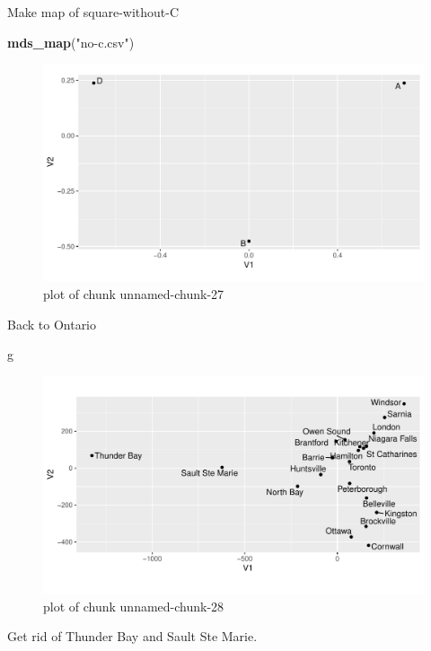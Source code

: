 \documentclass[ignorenonframetext,]{beamer}
\newenvironment{Shaded}{\begin{snugshade}}{\end{snugshade}}
\newcommand{\KeywordTok}[1]{\textcolor[rgb]{0.13,0.29,0.53}{\textbf{#1}}}
\newcommand{\NormalTok}[1]{#1}
\newcommand{\StringTok}[1]{\textcolor[rgb]{0.31,0.60,0.02}{#1}}
\begin{document}
\begin{frame}[fragile]{Make map of square-without-C}
\protect\hypertarget{make-map-of-square-without-c}{}

\begin{Shaded}
\begin{Highlighting}[]
\KeywordTok{mds_map}\NormalTok{(}\StringTok{"no-c.csv"}\NormalTok{)}
\end{Highlighting}
\end{Shaded}

\begin{figure}
\centering
\includegraphics{figure/unnamed-chunk-27-1.pdf}
\caption{plot of chunk unnamed-chunk-27}
\end{figure}

\end{frame}

\begin{frame}[fragile]{Back to Ontario}
\protect\hypertarget{back-to-ontario}{}

\begin{Shaded}
\begin{Highlighting}[]
\NormalTok{g}
\end{Highlighting}
\end{Shaded}

\begin{figure}
\centering
\includegraphics{figure/unnamed-chunk-28-1.pdf}
\caption{plot of chunk unnamed-chunk-28}
\end{figure}

Get rid of Thunder Bay and Sault Ste Marie.

\end{frame}
\end{document}
